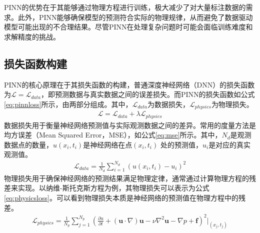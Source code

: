 PINN的优势在于其能够通过物理方程进行训练，极大减少了对大量标注数据的需求。此外，PINN能够确保模型的预测符合实际的物理规律，从而避免了数据驱动模型可能出现的不合理结果。尽管PINN在处理复杂问题时可能会面临训练难度和求解精度的挑战。
\subsection{损失函数构建}
PINN的核心原理在于其损失函数的构建，普通深度神经网络（DNN）的损失函数为$\mathcal{L} = \mathcal{L}_{data}$，即预测数据与真实数据之间的误差损失。而PINN的损失函数如公式\eqref{eq:pinnloss}所示，由两部分组成。其中，$\mathcal{L}_{data}$为数据损失，$\mathcal{L}_{physics}$为物理损失。
\begin{align}
  \mathcal{L} = \mathcal{L}_{data} + \lambda\mathcal{L}_{physics} \label{eq:pinnloss}
\end{align}
数据损失用于衡量神经网络预测值与实际观测数据之间的差异。常用的度量方法是均方误差（Mean Squared Error，MSE），如公式\eqref{eq:mse}所示。其中，$N_d$是观测数据点的数量，$u(x_i, t_i)$是神经网络在点$(x_i, t_i)$ 处的预测值，$u_i$是对应的真实观测值。
\begin{align}
  \mathcal{L}_{data} = \frac{1}{N_d} \sum_{i=1}^{N_d} \left( u(x_i, t_i) - u_i \right)^2 \label{eq:mse}
\end{align}
物理损失用于确保神经网络的预测结果满足物理定律，通常通过计算物理方程的残差来实现。以纳维-斯托克斯方程为例，其物理损失可以表示为公式\eqref{eq:physicsloss}。可以看到物理损失本质是神经网络的预测值在物理方程中的残差。
\begin{align}
  \mathcal{L}_{physics} = \frac{1}{N_p} \sum_{j=1}^{N_p} \left( \frac{\partial u}{\partial t} + (\mathbf{u} \cdot \nabla) \mathbf{u} - \nu \nabla^2 \mathbf{u} - \nabla p + \mathbf{f} \right)^2 \bigg|_{(x_j, t_j)} \label{eq:physicsloss}
\end{align}
